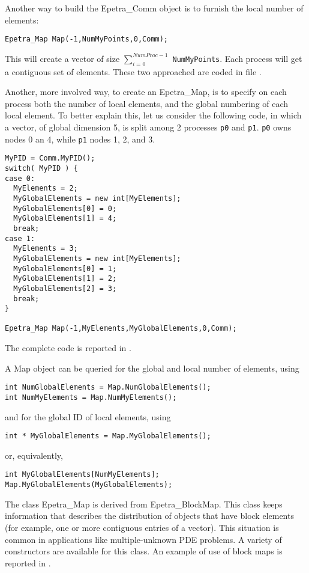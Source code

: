 Another way to build the Epetra\_Comm object is to furnish the local
number of elements:
\begin{verbatim}
Epetra_Map Map(-1,NumMyPoints,0,Comm);
\end{verbatim}
This will create a vector of size $\sum_{i=0}^{NumProc-1}$
\verb!NumMyPoints!. Each process will get a contiguous set of elements.
These two approached are coded in file .

Another, more involved way, to create an Epetra\_Map, is to specify on
each process both the number of local elements, and the global numbering
of each local element. To better explain this, let us consider the
following code, in which a vector, of global dimension 5, is split among
2 processes \verb!p0! and \verb!p1!. \verb!p0! owns nodes 0 an 4, while
\verb!p1! nodes 1, 2, and 3.
\begin{verbatim}
MyPID = Comm.MyPID();
switch( MyPID ) {
case 0:
  MyElements = 2;
  MyGlobalElements = new int[MyElements];
  MyGlobalElements[0] = 0;
  MyGlobalElements[1] = 4;
  break;
case 1:
  MyElements = 3;
  MyGlobalElements = new int[MyElements];
  MyGlobalElements[0] = 1;
  MyGlobalElements[1] = 2;
  MyGlobalElements[2] = 3;
  break;
}

Epetra_Map Map(-1,MyElements,MyGlobalElements,0,Comm);
\end{verbatim}
The complete code is reported in .

A Map object can be queried for the global and local number of elements,
using
\begin{verbatim}
int NumGlobalElements = Map.NumGlobalElements();
int NumMyElements = Map.NumMyElements();
\end{verbatim}
and for the global ID of local elements, using
\begin{verbatim}
int * MyGlobalElements = Map.MyGlobalElements();
\end{verbatim}
or, equivalently,
\begin{verbatim}
int MyGlobalElements[NumMyElements];
Map.MyGlobalElements(MyGlobalElements);
\end{verbatim}

\bigskip

The class Epetra\_Map is derived from Epetra\_BlockMap. This class keeps
information that describes the distribution of objects that have block
elements (for example, one or more contiguous entries of a vector). This
situation is common in applications like multiple-unknown PDE problems.
A variety of constructors are available for this class. An example of
use of block maps is reported in .

